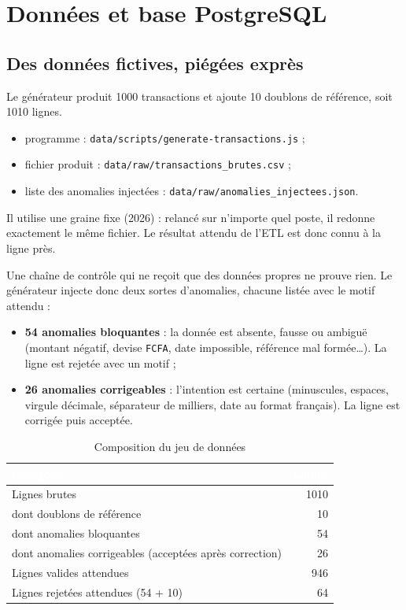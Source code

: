 \chapter{Données et base PostgreSQL}\label{chap:donnees}

\section{Des données fictives, piégées exprès}
Le générateur produit 1000 transactions et ajoute 10 doublons de référence, soit 1010 lignes.
\begin{itemize}
  \item programme : \texttt{data/scripts/generate-transactions.js} ;
  \item fichier produit : \texttt{data/raw/transactions\_brutes.csv} ;
  \item liste des anomalies injectées : \texttt{data/raw/anomalies\_injectees.json}.
\end{itemize}
Il utilise une graine fixe (2026) : relancé sur n'importe quel poste, il redonne exactement le même
fichier. Le résultat attendu de l'ETL est donc connu à la ligne près.

Une chaîne de contrôle qui ne reçoit que des données propres ne prouve rien. Le générateur injecte
donc deux sortes d'anomalies, chacune listée avec le motif attendu :
\begin{itemize}
  \item \textbf{54 anomalies bloquantes} : la donnée est absente, fausse ou ambiguë (montant négatif,
        devise \texttt{FCFA}, date impossible, référence mal formée\ldots). La ligne est rejetée avec un motif ;
  \item \textbf{26 anomalies corrigeables} : l'intention est certaine (minuscules, espaces, virgule
        décimale, séparateur de milliers, date au format français). La ligne est corrigée puis acceptée.
\end{itemize}

\begin{table}[H]
\centering\small
\caption{Composition du jeu de données}
\begin{tabular}{|l|r|}
\hline
\rowcolor{bluedark}\textcolor{white}{\textbf{Catégorie}} & \textcolor{white}{\textbf{Lignes}} \\
\hline
Lignes brutes & 1010 \\
\hline
\quad dont doublons de référence & 10 \\
\hline
\quad dont anomalies bloquantes & 54 \\
\hline
\quad dont anomalies corrigeables (acceptées après correction) & 26 \\
\hline
Lignes valides attendues & 946 \\
\hline
Lignes rejetées attendues (54 + 10) & 64 \\
\hline
\end{tabular}
\end{table}

